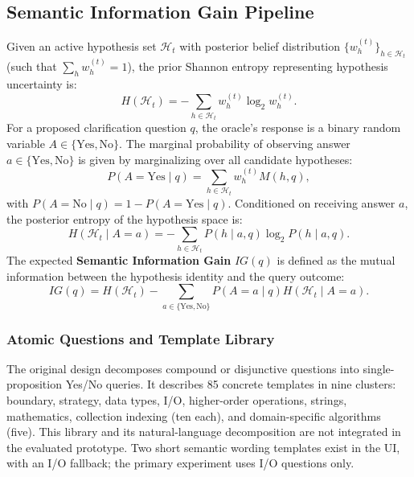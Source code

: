 \subsection{Semantic Information Gain Pipeline}\label{sec:method:ig}

Given an active hypothesis set $\mathcal{H}_t$ with posterior belief distribution $\{w_h^{(t)}\}_{h \in \mathcal{H}_t}$ (such that $\sum_h w_h^{(t)} = 1$), the prior Shannon entropy representing hypothesis uncertainty is:
\begin{equation}
    H(\mathcal{H}_t) = - \sum_{h \in \mathcal{H}_t} w_h^{(t)} \log_2 w_h^{(t)}.
\end{equation}
For a proposed clarification question $q$, the oracle's response is a binary random variable $A \in \{\text{Yes}, \text{No}\}$. The marginal probability of observing answer $a \in \{\text{Yes}, \text{No}\}$ is given by marginalizing over all candidate hypotheses:
\begin{equation}
    P(A = \text{Yes} \mid q) = \sum_{h \in \mathcal{H}_t} w_h^{(t)} M(h, q),
\end{equation}
with $P(A = \text{No} \mid q) = 1 - P(A = \text{Yes} \mid q)$. Conditioned on receiving answer $a$, the posterior entropy of the hypothesis space is:
\begin{equation}
    H(\mathcal{H}_t \mid A = a) = - \sum_{h \in \mathcal{H}_t} P(h \mid a, q) \log_2 P(h \mid a, q).
\end{equation}
The expected \textbf{Semantic Information Gain} $IG(q)$ is defined as the mutual information between the hypothesis identity and the query outcome:
\begin{equation}\label{eq:ig_canonical}
    IG(q) = H(\mathcal{H}_t) - \sum_{a \in \{\text{Yes}, \text{No}\}} P(A = a \mid q) H(\mathcal{H}_t \mid A = a).
\end{equation}

\subsubsection{Atomic Questions and Template Library}
The original design decomposes compound or disjunctive questions into single-proposition Yes/No queries. It describes 85 concrete templates in nine clusters: boundary, strategy, data types, I/O, higher-order operations, strings, mathematics, collection indexing (ten each), and domain-specific algorithms (five). This library and its natural-language decomposition are not integrated in the evaluated prototype. Two short semantic wording templates exist in the UI, with an I/O fallback; the primary experiment uses I/O questions only.

